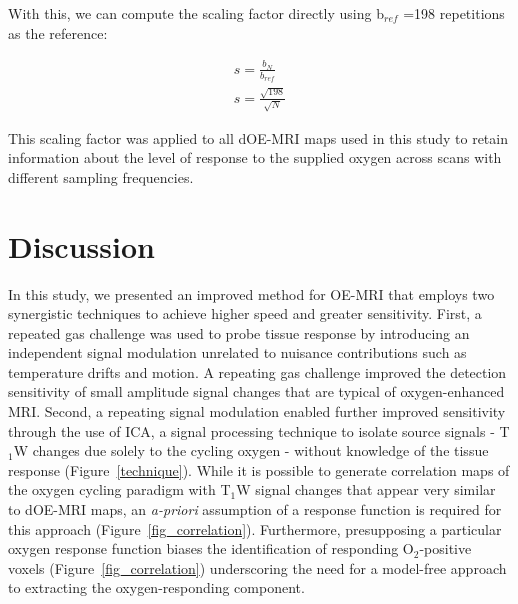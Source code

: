 With this, we can compute the scaling factor directly using b$_{ref}$ =198 repetitions as the reference:

\begin{align}
s = \frac{b_{N}}{b_{ref}} \nonumber \\
s = \frac{\sqrt{198}}{\sqrt{N}} 
\end{align}

This scaling factor was applied to all \acs{dOE-MRI} maps used in this study to retain information about the level of response to the supplied oxygen across scans with different sampling frequencies.

\section{Discussion}

In this study, we presented an improved method for OE-MRI that employs two synergistic techniques to achieve higher speed and greater sensitivity.
First, a repeated gas challenge was used to probe tissue response by introducing an independent signal modulation unrelated to nuisance contributions such as temperature drifts and motion.
A repeating gas challenge improved the detection sensitivity of small amplitude signal changes that are typical of oxygen-enhanced MRI.
Second, a repeating signal modulation enabled further improved sensitivity through the use of \acs{ICA}, a signal processing technique to isolate source signals - T$_1$W changes due solely to the cycling oxygen - without knowledge of the tissue response (Figure~\ref{technique}).
While it is possible to generate correlation maps of the oxygen cycling paradigm with T$_1$W signal changes that appear very similar to \acs{dOE-MRI} maps, an \emph{a-priori} assumption of a response function is required for this approach (Figure~\ref{fig_correlation}).
Furthermore, presupposing a particular oxygen response function biases the identification of responding O$_2$-positive voxels (Figure~\ref{fig_correlation}) underscoring the need for a model-free approach to extracting the oxygen-responding component.

